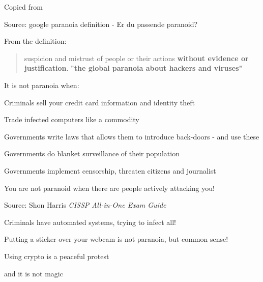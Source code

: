\documentclass[20pt,landscape,a4paper,footrule]{foils}
\begin{document}
Copied from 



Source: google paranoia definition - Er du passende paranoid?



From the definition:
\begin{quote}
suspicion and mistrust of people or their actions {\bf without evidence or justification}.
\bf "the global paranoia about hackers and viruses"
\end{quote}

\begin{list1}
\item It is not paranoia when:
\begin{list2}
\item Criminals sell your credit card information and identity theft
\item Trade infected computers like a commodity
\item Governments write laws that allows them to introduce back-doors - and use these
\item Governments do blanket surveillance of their population
\item Governments implement censorship, threaten citizens and journalist
\end{list2}
\end{list1}

\vskip 1cm
\centerline{You are not paranoid when there are people actively attacking you!}




Source: Shon Harris \emph{CISSP All-in-One Exam Guide}

Criminals have automated systems, trying to infect all!

Putting a sticker over your webcam is not paranoia, but common sense!

\slide{}




{\large Using crypto is a peaceful protest}

{\large and it is not magic}
\end{document}
